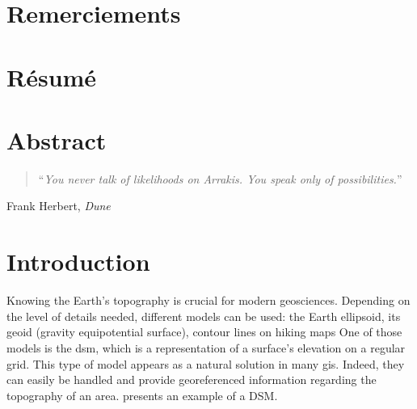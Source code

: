 
\chapter*{Remerciements}

\newpage
\chapter*{Résumé}

\newpage
\chapter*{Abstract}

\newpage
\vspace*{\fill} 
\begin{quote}
\vspace{1cm}
\centering
``\textit{You never talk of likelihoods on Arrakis. You speak only of possibilities.}''
\end{quote}
\vspace{0.5cm}
\begin{flushright}
Frank Herbert, \textit{Dune}
\end{flushright}
\vspace*{\fill}


\newpage
\chapter*{Introduction}
Knowing the Earth's topography is crucial for modern geosciences. Depending on the level of details needed, different models can be used: the Earth ellipsoid, its geoid (gravity equipotential surface), contour lines on hiking maps \etc One of those models is the \acrfull{dsm}, which is a representation of a surface's elevation on a regular grid. This type of model appears as a natural solution in many \acrfull{gis}. Indeed, they can easily be handled and provide georeferenced information regarding the topography of an area.  presents an example of a DSM.


